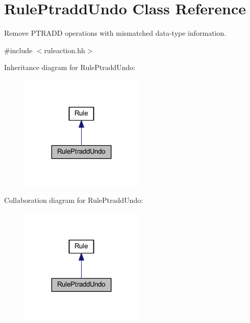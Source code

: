 \hypertarget{class_rule_ptradd_undo}{}\section{Rule\+Ptradd\+Undo Class Reference}
\label{class_rule_ptradd_undo}


Remove P\+T\+R\+A\+DD operations with mismatched data-\/type information.  




{\ttfamily \#include $<$ruleaction.\+hh$>$}



Inheritance diagram for Rule\+Ptradd\+Undo\+:
\nopagebreak
\begin{figure}[H]
\begin{center}
\leavevmode
\includegraphics[width=167pt]{class_rule_ptradd_undo__inherit__graph}
\end{center}
\end{figure}


Collaboration diagram for Rule\+Ptradd\+Undo\+:
\nopagebreak
\begin{figure}[H]
\begin{center}
\leavevmode
\includegraphics[width=167pt]{class_rule_ptradd_undo__coll__graph}
\end{center}
\end{figure}
